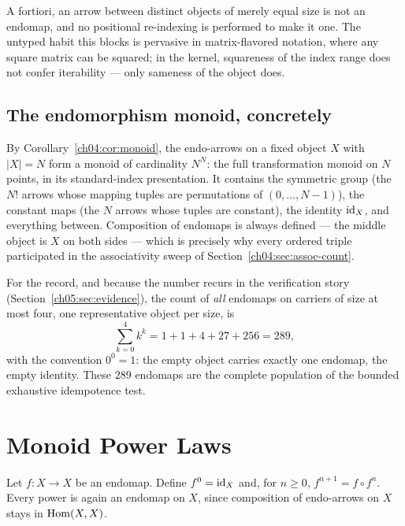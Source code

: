 \begin{ruleenv}
\label{ch05:rule:samecard}
A fortiori, an arrow between distinct objects of merely equal size is not an
endomap, and no positional re-indexing is performed to make it one. The
untyped habit this blocks is pervasive in matrix-flavored notation, where
any square matrix can be squared; in the kernel, squareness of the index
range does not confer iterability --- only sameness of the object does.
\end{ruleenv}

\subsection{The endomorphism monoid, concretely}

By Corollary~\ref{ch04:cor:monoid}, the endo-arrows on a fixed object $X$
with $|X| = N$ form a monoid of cardinality $N^{N}$: the full transformation
monoid on $N$ points, in its standard-index presentation. It contains the
symmetric group (the $N!$ arrows whose mapping tuples are permutations of
$(0, \dots, N-1)$), the constant maps (the $N$ arrows whose tuples are
constant), the identity $\mathrm{id}_X$, and everything between. Composition of
endomaps is always defined --- the middle object is $X$ on both sides ---
which is precisely why every ordered triple participated in the
associativity sweep of Section~\ref{ch04:sec:assoc-count}.

For the record, and because the number recurs in the verification story
(Section~\ref{ch05:sec:evidence}), the count of \emph{all} endomaps on
carriers of size at most four, one representative object per size, is
\[
  \sum_{k=0}^{4} k^{k} = 1 + 1 + 4 + 27 + 256 = 289,
\]
with the convention $0^{0} = 1$: the empty object carries exactly one
endomap, the empty identity. These $289$ endomaps are the complete
population of the bounded exhaustive idempotence test.

\section{Monoid Power Laws}
\label{ch05:sec:powers}

\begin{definition}[Powers]
\label{ch05:def:power}
Let $f : X \to X$ be an endomap. Define $f^{0} = \mathrm{id}_X$ and, for $n \ge 0$,
$f^{n+1} = f \circ f^{n}$. Every power is again an endomap on $X$, since
composition of endo-arrows on $X$ stays in $\mathrm{Hom}(X, X)$.
\end{definition}

